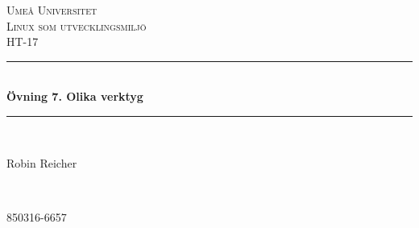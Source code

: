 \documentclass[11pt]{article}
\begin{document}
\renewcommand{\thesubsection}{\thesection.\alph{subsection}}


\begin{titlepage} %
	\newcommand{\HRule}{\rule{\linewidth}{0.5mm}} %

	\center %


	\textsc{\LARGE Umeå Universitet}\\[1.5cm] %

	\textsc{\Large Linux som utvecklingsmiljö}\\[0.5cm] %

	\textsc{\large HT-17}\\[0.5cm] %


	\HRule\\[0.4cm]

	{\huge\bfseries Övning 7. Olika verktyg}\\[0.4cm] %

	\HRule\\[1.5cm]


	\begin{minipage}{0.4\textwidth}
		\begin{flushleft}
			\large
			Robin Reicher
		\end{flushleft}
	\end{minipage}
	~
	\begin{minipage}{0.4\textwidth}
		\begin{flushright}
			\large
			850316-6657
		\end{flushright}
	\end{minipage}


\end{titlepage}
\end{document}
